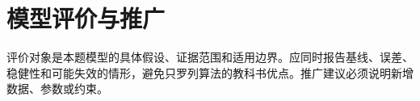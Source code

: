 \section{模型评价与推广}
评价对象是本题模型的具体假设、证据范围和适用边界。应同时报告基线、误差、稳健性和可能失效的情形，避免只罗列算法的教科书优点。推广建议必须说明新增数据、参数或约束。
